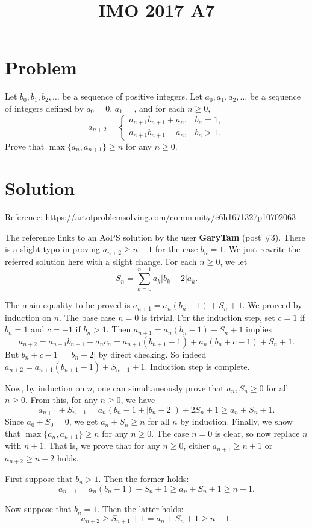 \documentclass{article}
\title{IMO 2017 A7}
\author{}
\date{}
\begin{document}
\maketitle



\section*{Problem}

Let $b_0, b_1, b_2, \ldots$ be a sequence of positive integers.
Let $a_0, a_1, a_2, \ldots$ be a sequence of integers defined by $a_0 = 0$, $a_1 = $, and for each $n \geq 0$,
$$ a_{n + 2} = \begin{cases} a_{n + 1} b_{n + 1} + a_n, & b_n = 1, \\ a_{n + 1} b_{n + 1} - a_n, & b_n > 1. \end{cases} $$
Prove that $\max\{a_n, a_{n + 1}\} \geq n$ for any $n \geq 0$.



\section*{Solution}

Reference: \url{https://artofproblemsolving.com/community/c6h1671327p10702063}

The reference links to an AoPS solution by the user \textbf{GaryTam} (post \#3).
There is a slight typo in proving $a_{n + 2} \geq n + 1$ for the case $b_n = 1$.
We just rewrite the referred solution here with a slight change.
For each $n \geq 0$, we let
\[ S_n = \sum_{k = 0}^{n - 1} a_k |b_k - 2| a_k. \]

The main equality to be proved is $a_{n + 1} = a_n (b_n - 1) + S_n + 1$.
We proceed by induction on $n$.
The base case $n = 0$ is trivial.
For the induction step, set $c = 1$ if $b_n = 1$ and $c = -1$ if $b_n > 1$.
Then $a_{n + 1} = a_n (b_n - 1) + S_n + 1$ implies
\[ a_{n + 2} = a_{n + 1} b_{n + 1} + a_n c_n = a_{n + 1} (b_{n + 1} - 1) + a_n (b_n + c - 1) + S_n + 1. \]
But $b_n + c - 1 = |b_n - 2|$ by direct checking.
So indeed $a_{n + 2} = a_{n + 1} (b_{n + 1} - 1) + S_{n + 1} + 1$.
Induction step is complete.

Now, by induction on $n$, one can simultaneously prove that $a_n, S_n \geq 0$ for all $n \geq 0$.
From this, for any $n \geq 0$, we have
\[ a_{n + 1} + S_{n + 1} = a_n (b_n - 1 + |b_n - 2|) + 2 S_n + 1 \geq a_n + S_n + 1. \]
Since $a_0 + S_0 = 0$, we get $a_n + S_n \geq n$ for all $n$ by induction.
Finally, we show that $\max\{a_n, a_{n + 1}\} \geq n$ for any $n \geq 0$.
The case $n = 0$ is clear, so now replace $n$ with $n + 1$.
That is, we prove that for any $n \geq 0$, either $a_{n + 1} \geq n + 1$ or $a_{n + 2} \geq n + 2$ holds.

First suppose that $b_n > 1$.
Then the former holds:
\[ a_{n + 1} = a_n (b_n - 1) + S_n + 1 \geq a_n + S_n + 1 \geq n + 1. \]

Now suppose that $b_n = 1$.
Then the latter holds:
\[ a_{n + 2} \geq S_{n + 1} + 1 = a_n + S_n + 1 \geq n + 1. \]
\end{document}
